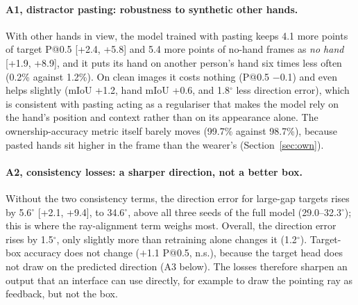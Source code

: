 \paragraph{A1, distractor pasting: robustness to synthetic other hands.} With other hands in view, the model trained with pasting keeps 4.1 more points of target P@0.5 [+2.4, +5.8] and 5.4 more points of no-hand frames as \emph{no hand} [+1.9, +8.9], and it puts its hand on another person's hand six times less often (0.2\% against 1.2\%). On clean images it costs nothing (P@0.5 $-$0.1) and even helps slightly (mIoU +1.2, hand mIoU +0.6, and 1.8$^\circ$ less direction error), which is consistent with pasting acting as a regulariser that makes the model rely on the hand's position and context rather than on its appearance alone. The ownership-accuracy metric itself barely moves (99.7\% against 98.7\%), because pasted hands sit higher in the frame than the wearer's (Section~\ref{sec:own}).

\paragraph{A2, consistency losses: a sharper direction, not a better box.} Without the two consistency terms, the direction error for large-gap targets rises by 5.6$^\circ$ [+2.1, +9.4], to 34.6$^\circ$, above all three seeds of the full model (29.0--32.3$^\circ$); this is where the ray-alignment term weighs most. Overall, the direction error rises by 1.5$^\circ$, only slightly more than retraining alone changes it (1.2$^\circ$). Target-box accuracy does not change ($+$1.1 P@0.5, n.s.), because the target head does not draw on the predicted direction (A3 below). The losses therefore sharpen an output that an interface can use directly, for example to draw the pointing ray as feedback, but not the box.

